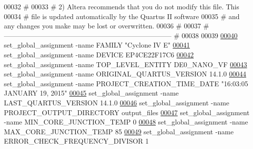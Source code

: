 \begin{DoxyCode}
00032 \textcolor{keyword}{#}
00033 \textcolor{keyword}{# 2) Altera recommends that you do not modify this file. This}
00034 \textcolor{keyword}{#    file is updated automatically by the Quartus II software}
00035 \textcolor{keyword}{#    and any changes you make may be lost or overwritten.}
00036 \textcolor{keyword}{#}
00037 \textcolor{keyword}{# -------------------------------------------------------------------------- #}
00038 
00039 
\hypertarget{_d_e0___n_a_n_o___v_f_8qsf_source_l00040}{}\hyperlink{_d_e0___n_a_n_o___v_f_8qsf_ab231a1c4706957244c918356f65cfec8}{00040} set\_global\_assignment -name FAMILY "Cyclone IV E"
\hypertarget{_d_e0___n_a_n_o___v_f_8qsf_source_l00041}{}\hyperlink{_d_e0___n_a_n_o___v_f_8qsf_a430498eb59a90f64a3df65642194cb5a}{00041} set\_global\_assignment -name DEVICE EP4CE22F17C6
\hypertarget{_d_e0___n_a_n_o___v_f_8qsf_source_l00042}{}\hyperlink{_d_e0___n_a_n_o___v_f_8qsf_a1029cf591523124c2eccd157bd2833da}{00042} set\_global\_assignment -name TOP\_LEVEL\_ENTITY DE0\_NANO\_VF
\hypertarget{_d_e0___n_a_n_o___v_f_8qsf_source_l00043}{}\hyperlink{_d_e0___n_a_n_o___v_f_8qsf_acd9cab3490a4efd08533ef667b2e65d1}{00043} set\_global\_assignment -name ORIGINAL\_QUARTUS\_VERSION \textcolor{vhdllogic}{14}.\textcolor{vhdllogic}{1}.\textcolor{vhdllogic}{0}
\hypertarget{_d_e0___n_a_n_o___v_f_8qsf_source_l00044}{}\hyperlink{_d_e0___n_a_n_o___v_f_8qsf_a7aa35954da0d8611b398f9c1e2d18507}{00044} set\_global\_assignment -name PROJECT\_CREATION\_TIME\_DATE "16:\textcolor{vhdllogic}{03}:\textcolor{vhdllogic}{05}  JANUARY \textcolor{vhdllogic}{19}, 2015"
\hypertarget{_d_e0___n_a_n_o___v_f_8qsf_source_l00045}{}\hyperlink{_d_e0___n_a_n_o___v_f_8qsf_af9b4f5153c889c7aad3c78695bcf0cee}{00045} set\_global\_assignment -name LAST\_QUARTUS\_VERSION \textcolor{vhdllogic}{14}.\textcolor{vhdllogic}{1}.\textcolor{vhdllogic}{0}
\hypertarget{_d_e0___n_a_n_o___v_f_8qsf_source_l00046}{}\hyperlink{_d_e0___n_a_n_o___v_f_8qsf_aeca3aec4715d85dc6e882cad8038f949}{00046} set\_global\_assignment -name PROJECT\_OUTPUT\_DIRECTORY output\_files
\hypertarget{_d_e0___n_a_n_o___v_f_8qsf_source_l00047}{}\hyperlink{_d_e0___n_a_n_o___v_f_8qsf_a5769c0f9c049888fc60edca28f890fdb}{00047} set\_global\_assignment -name MIN\_CORE\_JUNCTION\_TEMP \textcolor{vhdllogic}{0}
\hypertarget{_d_e0___n_a_n_o___v_f_8qsf_source_l00048}{}\hyperlink{_d_e0___n_a_n_o___v_f_8qsf_a0398daaf5e8a92ea1cedcad52a33d23f}{00048} set\_global\_assignment -name MAX\_CORE\_JUNCTION\_TEMP \textcolor{vhdllogic}{85}
\hypertarget{_d_e0___n_a_n_o___v_f_8qsf_source_l00049}{}\hyperlink{_d_e0___n_a_n_o___v_f_8qsf_af683df31e9d4c4217389db00b7bc829a}{00049} set\_global\_assignment -name ERROR\_CHECK\_FREQUENCY\_DIVISOR \textcolor{vhdllogic}{1}

\end{DoxyCode}
